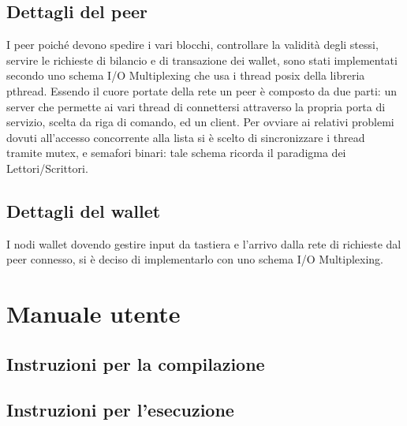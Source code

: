 \documentclass[a4paper,10pt]{report}
\begin{document}
    \section{Dettagli del peer}\noindent
 I peer poiché devono spedire i vari blocchi, controllare la validità degli stessi, servire le richieste di bilancio e di transazione dei wallet, sono stati implementati secondo uno schema I/O Multiplexing che usa i thread posix della libreria pthread. Essendo il cuore portate della rete un peer è composto da due parti: un server che permette ai vari thread di connettersi attraverso la propria porta di servizio, scelta da riga di comando, ed un client.
Per ovviare ai relativi problemi dovuti all'accesso concorrente alla lista si è scelto di sincronizzare i thread tramite mutex, e semafori binari: tale schema ricorda il paradigma dei Lettori/Scrittori.

    \section{Dettagli del wallet}\noindent
    
 I nodi wallet dovendo gestire input da tastiera e l'arrivo dalla rete di richieste dal peer connesso, si è deciso di implementarlo con uno schema I/O Multiplexing.

    

  \chapter{Manuale utente}

  \section{Instruzioni per la compilazione}\noindent



  \section{Instruzioni per l'esecuzione}\noindent
\end{document}
